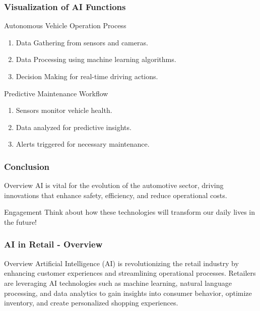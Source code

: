 \documentclass{beamer}
\begin{document}
\begin{frame}[fragile]
    \frametitle{Visualization of AI Functions}
    \begin{block}{Autonomous Vehicle Operation Process}
        \begin{enumerate}
            \item Data Gathering from sensors and cameras.
            \item Data Processing using machine learning algorithms.
            \item Decision Making for real-time driving actions.
        \end{enumerate}
    \end{block}

    \begin{block}{Predictive Maintenance Workflow}
        \begin{enumerate}
            \item Sensors monitor vehicle health.
            \item Data analyzed for predictive insights.
            \item Alerts triggered for necessary maintenance.
        \end{enumerate}
    \end{block}
\end{frame}

\begin{frame}[fragile]
    \frametitle{Conclusion}
    \begin{block}{Overview}
        AI is vital for the evolution of the automotive sector, driving innovations that enhance safety, efficiency, and reduce operational costs. 
    \end{block}
    \begin{block}{Engagement}
        Think about how these technologies will transform our daily lives in the future!
    \end{block}
\end{frame}

\begin{frame}[fragile]
    \frametitle{AI in Retail - Overview}
    \begin{block}{Overview}
        Artificial Intelligence (AI) is revolutionizing the retail industry by enhancing customer experiences and streamlining operational processes. 
        Retailers are leveraging AI technologies such as machine learning, natural language processing, and data analytics to gain insights into consumer behavior, optimize inventory, and create personalized shopping experiences.
    \end{block}
\end{frame}
\end{document}
